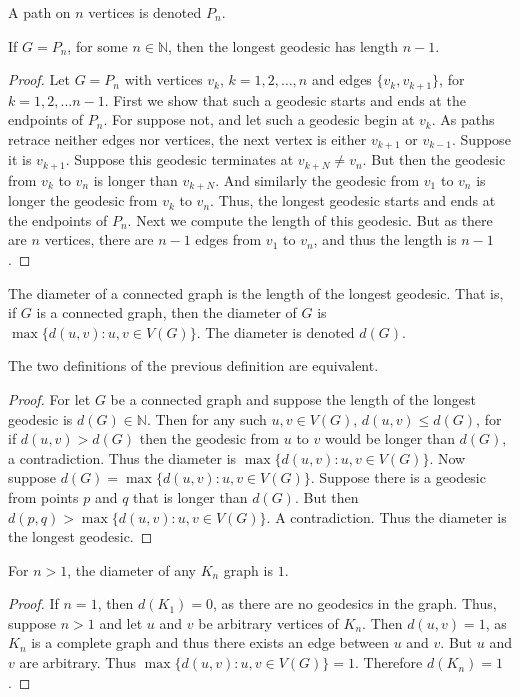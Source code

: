 \documentclass[crop=false,class=book]{standalone}
\begin{document}
\begin{definition}
A path on $n$ vertices is denoted $P_n$.
\end{definition}
\begin{corollary}
If $G = P_n$, for some $n\in \mathbb{N}$, then the longest geodesic has length $n-1$.
\end{corollary}
\begin{proof}
Let $G=P_n$ with vertices $v_k$, $k=1,2,\hdots, n$ and edges $\{v_k,v_{k+1}\}$, for $k=1,2,\hdots n-1$. First we show that such a geodesic starts and ends at the endpoints of $P_n$. For suppose not, and let such a geodesic begin at $v_k$. As paths retrace neither edges nor vertices, the next vertex is either $v_{k+1}$ or $v_{k-1}$. Suppose it is $v_{k+1}$. Suppose this geodesic terminates at $v_{k+N} \ne v_{n}$. But then the geodesic from $v_{k}$ to $v_{n}$ is longer than $v_{k+N}$. And similarly the geodesic from $v_1$ to $v_n$ is longer the geodesic from $v_k$ to $v_n$. Thus, the longest geodesic starts and ends at the endpoints of $P_n$. Next we compute the length of this geodesic. But as there are $n$ vertices, there are $n-1$ edges from $v_1$ to $v_n$, and thus the length is $n-1$.
\end{proof}
\begin{definition}
The diameter of a connected graph is the length of the longest geodesic. That is, if $G$ is a connected graph, then the diameter of $G$ is $\max\{d(u,v): u,v\in V(G)\}$. The diameter is denoted $d(G)$.
\end{definition}
\begin{corollary}
The two definitions of the previous definition are equivalent.
\end{corollary}
\begin{proof}
For let $G$ be a connected graph and suppose the length of the longest geodesic is $d(G)\in \mathbb{N}$. Then for any such $u,v\in V(G)$, $d(u,v) \leq d(G)$, for if $d(u,v)> d(G)$ then the geodesic from $u$ to $v$ would be longer than $d(G)$, a contradiction. Thus the diameter is $\max\{d(u,v):u,v\in V(G)\}$. Now suppose $d(G) = \max\{d(u,v):u,v \in V(G)\}$. Suppose there is a geodesic from points $p$ and $q$ that is longer than $d(G)$. But then $d(p,q)>\max\{d(u,v):u,v\in V(G)\}$. A contradiction. Thus the diameter is the longest geodesic.
\end{proof}
\begin{corollary}
For $n>1$, the diameter of any $K_n$ graph is $1$.
\end{corollary}
\begin{proof}
If $n=1$, then $d(K_1) = 0$, as there are no geodesics in the graph. Thus, suppose $n>1$ and let $u$ and $v$ be arbitrary vertices of $K_n$. Then $d(u,v)=1$, as $K_n$ is a complete graph and thus there exists an edge between $u$ and $v$. But $u$ and $v$ are arbitrary. Thus $\max\{d(u,v):u,v\in V(G)\} = 1$. Therefore $d(K_n) = 1$.
\end{proof}
\end{document}
